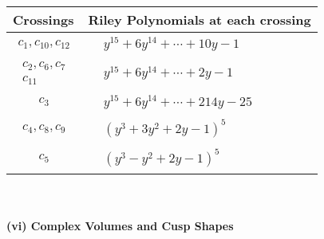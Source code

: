 \documentclass[1p]{elsarticle_modified}
\theoremstyle{definition}
\begin{document}
\begin{tabular}{m{50pt}|m{274pt}}
Crossings & \hspace{64pt}Riley Polynomials at each crossing \\
\hline $$\begin{aligned}c_{1},c_{10},c_{12}\end{aligned}$$&$\begin{aligned}
&y^{15}+6 y^{14}+\cdots+10 y-1
\end{aligned}$\\
\hline $$\begin{aligned}c_{2},c_{6},c_{7}\\c_{11}\end{aligned}$$&$\begin{aligned}
&y^{15}+6 y^{14}+\cdots+2 y-1
\end{aligned}$\\
\hline $$\begin{aligned}c_{3}\end{aligned}$$&$\begin{aligned}
&y^{15}+6 y^{14}+\cdots+214 y-25
\end{aligned}$\\
\hline $$\begin{aligned}c_{4},c_{8},c_{9}\end{aligned}$$&$\begin{aligned}
&(y^3+3 y^2+2 y-1)^5
\end{aligned}$\\
\hline $$\begin{aligned}c_{5}\end{aligned}$$&$\begin{aligned}
&(y^3- y^2+2 y-1)^5
\end{aligned}$\\
\hline
\end{tabular}\\~\\
\newpage\flushleft \textbf{(vi) Complex Volumes and Cusp Shapes}
\end{document}
